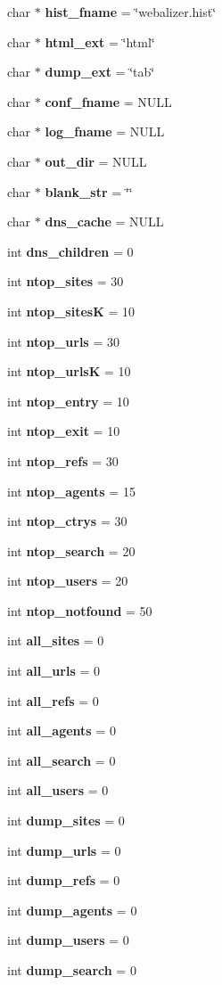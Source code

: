 \begin{CompactItemize}
char $\ast$ {\bf hist\_\-fname} = \char`\"{}webalizer.hist\char`\"{}
\item 
char $\ast$ {\bf html\_\-ext} = \char`\"{}html\char`\"{}
\item 
char $\ast$ {\bf dump\_\-ext} = \char`\"{}tab\char`\"{}
\item 
char $\ast$ {\bf conf\_\-fname} = NULL
\item 
char $\ast$ {\bf log\_\-fname} = NULL
\item 
char $\ast$ {\bf out\_\-dir} = NULL
\item 
char $\ast$ {\bf blank\_\-str} = \char`\"{}\char`\"{}
\item 
char $\ast$ {\bf dns\_\-cache} = NULL
\item 
int {\bf dns\_\-children} = 0
\item 
int {\bf ntop\_\-sites} = 30
\item 
int {\bf ntop\_\-sites\-K} = 10
\item 
int {\bf ntop\_\-urls} = 30
\item 
int {\bf ntop\_\-urls\-K} = 10
\item 
int {\bf ntop\_\-entry} = 10
\item 
int {\bf ntop\_\-exit} = 10
\item 
int {\bf ntop\_\-refs} = 30
\item 
int {\bf ntop\_\-agents} = 15
\item 
int {\bf ntop\_\-ctrys} = 30
\item 
int {\bf ntop\_\-search} = 20
\item 
int {\bf ntop\_\-users} = 20
\item 
int {\bf ntop\_\-notfound} = 50
\item 
int {\bf all\_\-sites} = 0
\item 
int {\bf all\_\-urls} = 0
\item 
int {\bf all\_\-refs} = 0
\item 
int {\bf all\_\-agents} = 0
\item 
int {\bf all\_\-search} = 0
\item 
int {\bf all\_\-users} = 0
\item 
int {\bf dump\_\-sites} = 0
\item 
int {\bf dump\_\-urls} = 0
\item 
int {\bf dump\_\-refs} = 0
\item 
int {\bf dump\_\-agents} = 0
\item 
int {\bf dump\_\-users} = 0
\item 
int {\bf dump\_\-search} = 0

\end{CompactItemize}
